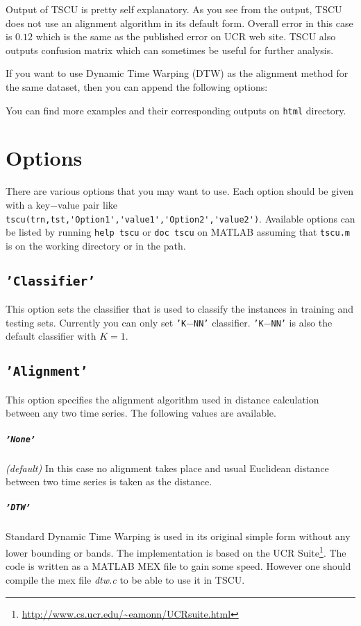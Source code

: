 \documentclass{article}
\newcommand{\parametre}[1]{\texttt{#1}}
\newcommand{\matlabfile}[1]{}
\begin{document}
\begin{scriptsize}
\matlabfile{tscu_manual_verbatim01.out}
\end{scriptsize}

Output of TSCU is pretty self explanatory.  As you see from the output, TSCU does not use an alignment algorithm in its default form. Overall error in this case is $0.12$ which is the same as the published error on UCR web site. TSCU also outputs confusion matrix which can sometimes be useful for further analysis.

If you want to use Dynamic Time Warping (DTW) as the alignment method for the same dataset, then you can append the following options:
\begin{scriptsize}
\matlabfile{tscu_manual_verbatim02.out}
\end{scriptsize}

You can find more examples and their corresponding outputs on \verb|html| directory.
\section{Options}
There are various options that you may want to use. 
Each option should be given with a key$-$value pair like \verb|tscu(trn,tst,'Option1','value1','Option2','value2')|. 
Available options can be listed by running \parametre{help tscu} or \parametre{doc tscu} on MATLAB assuming that \parametre{tscu.m} is on the working directory or in the path.

\subsection{\parametre{'Classifier'}}
This option sets the classifier that is used to classify the instances in training and testing sets. Currently you can only set \parametre{'K$-$NN'} classifier. \parametre{'K$-$NN'} is also the default classifier with $K=1$.

\subsection{\parametre{'Alignment'}} 
This option specifies the alignment algorithm used in distance calculation between any two time series. The following values are available.

\subparagraph*{\parametre{'None'}} \textit{ (default)} In this case no alignment takes place and usual Euclidean distance between two time series is taken as the distance.

\subparagraph*{\parametre{'DTW'}} Standard Dynamic Time Warping is used in its original simple form without any lower bounding or bands. 
The implementation is based on the UCR Suite\footnote{\url{http://www.cs.ucr.edu/~eamonn/UCRsuite.html}}.\@
The code is written as a MATLAB MEX file to gain some speed. However one should compile the mex file \textit{dtw.c} to be able to use it in TSCU.\@
\end{document}
